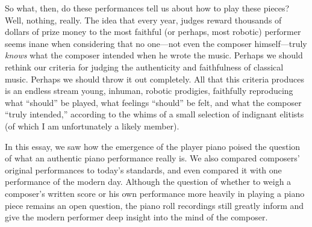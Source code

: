 \documentclass[titlepage,14pt]{article}
\begin{document}
\begin{doublespace}
So what, then, do these performances tell us about how to play these pieces? Well, nothing, really. %
The idea that every year, judges reward thousands of dollars of prize money to the most faithful (or perhaps, most robotic) performer seems inane when considering that no one---not even the composer himself---truly \textit{knows} what the composer intended when he wrote the music. Perhaps we should rethink our criteria for judging the authenticity and faithfulness of classical music. Perhaps we should throw it out completely. All that this criteria produces is an endless stream young, inhuman, robotic prodigies, faithfully reproducing what ``should'' be played, what feelings ``should'' be felt, and what the composer ``truly intended,'' according to the whims of a small selection of indignant elitists (of which I am unfortunately a likely member).

In this essay, we saw how the emergence of the player piano poised the question of what an authentic piano performance really is. We also compared composers' original performances to today's standards, and even compared it with one performance of the modern day. Although the question of whether to weigh a composer's written score or his own performance more heavily in playing a piano piece remains an open question, the piano roll recordings still greatly inform and give the modern performer deep insight into the mind of the composer.


\end{doublespace}

\large
\printbibliography
\end{document}
